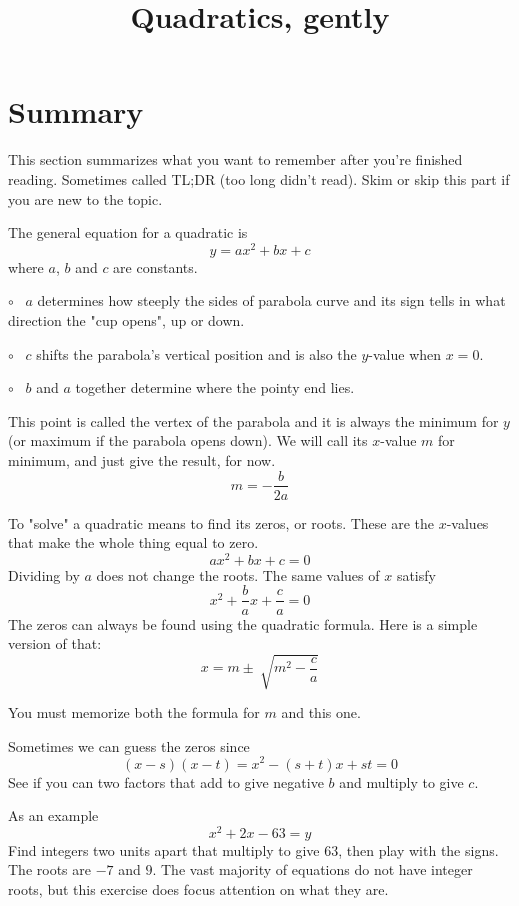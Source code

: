 \documentclass[11pt, oneside]{article}
\title{Quadratics, gently}
\date{}
\begin{document}
\maketitle
\Large


\section*{Summary}

This section summarizes what you want to remember after you're finished reading.  Sometimes called TL;DR (too long didn't read).  Skim or skip this part if you are new to the topic.

The general equation for a quadratic is
\[ y = ax^2 + bx + c \]
where $a$, $b$ and $c$ are constants. 

$\circ$ \ $a$ determines how steeply the sides of parabola curve and its sign tells in what direction the "cup opens", up or down.

$\circ$ \ $c$ shifts the parabola's vertical position and is also the $y$-value when $x = 0$.

$\circ$ \ $b$ and $a$ together determine where the pointy end lies.  

This point is called the vertex of the parabola and it is always the minimum for $y$ (or maximum if the parabola opens down).  We will call its $x$-value $m$ for minimum, and just give the result, for now.
\[ m = - \frac{b}{2a} \]

To "solve" a quadratic means to find its zeros, or roots.  These are the $x$-values that make the whole thing equal to zero.
\[ ax^2 + bx + c = 0 \]
Dividing by $a$ does not change the roots.  The same values of $x$ satisfy
\[ x^2 + \frac{b}{a} x + \frac{c}{a} =  0 \]
The zeros can always be found using the quadratic formula.  Here is a simple version of that:
\[ x = m \pm \ \sqrt{m^2 - \frac{c}{a}} \]

You must memorize both the formula for $m$ and this one.

Sometimes we can guess the zeros since
\[ (x - s)(x - t) = x^2 - (s + t)x + st = 0 \]
See if you can two factors that add to give negative $b$ and multiply to give $c$.

As an example
\[ x^2 + 2x - 63 = y \]
Find integers two units apart that multiply to give $63$, then play with the signs.  The roots are $-7$ and $9$.  The vast majority of equations do not have integer roots, but this exercise does focus attention on what they are.
\end{document}
